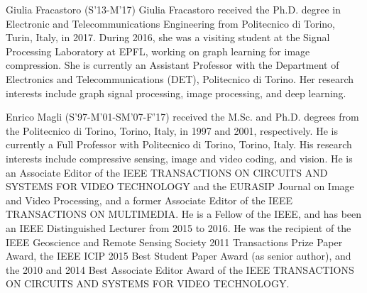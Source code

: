 \documentclass[journal]{IEEEtran}
\begin{document}
\begin{IEEEbiography}{Giulia Fracastoro} (S'13-M'17) Giulia Fracastoro received the Ph.D. degree in Electronic and Telecommunications Engineering from Politecnico di Torino, Turin, Italy, in 2017. During 2016, she was a visiting student at the Signal Processing Laboratory at EPFL, working on graph learning for image compression. She is currently an Assistant Professor with the Department of Electronics and Telecommunications (DET), Politecnico di Torino. Her research interests include graph signal processing, image processing, and deep learning.\end{IEEEbiography}


\begin{IEEEbiography}{Enrico Magli} (S'97-M'01-SM'07-F'17) received the M.Sc. and Ph.D. degrees from the Politecnico di Torino, Torino, Italy, in 1997 and 2001, respectively. He is currently a Full Professor with Politecnico di Torino, Torino, Italy. His research interests include compressive sensing, image and video coding, and vision. He is an Associate Editor of the IEEE TRANSACTIONS ON CIRCUITS AND SYSTEMS FOR VIDEO TECHNOLOGY and the EURASIP Journal on Image and Video Processing, and a former Associate Editor of the IEEE TRANSACTIONS ON MULTIMEDIA. He is a Fellow of the IEEE, and has been an IEEE Distinguished Lecturer from 2015 to 2016. He was the recipient of the IEEE Geoscience and Remote Sensing Society 2011 Transactions Prize Paper Award, the IEEE ICIP 2015 Best Student Paper Award (as senior author), and the 2010 and 2014 Best Associate Editor Award of the IEEE TRANSACTIONS ON CIRCUITS AND SYSTEMS FOR VIDEO TECHNOLOGY.
\end{IEEEbiography}
\end{document}
